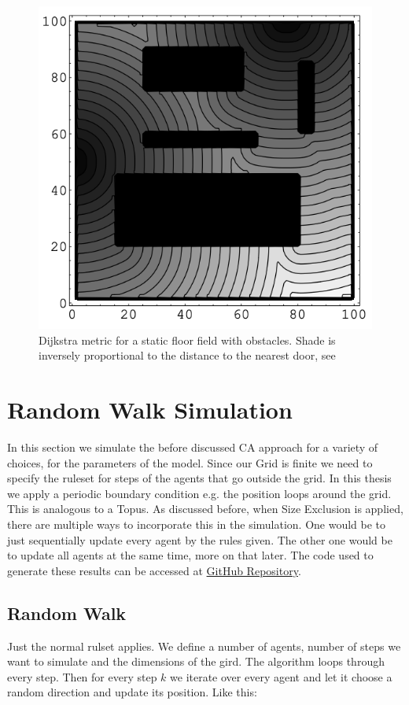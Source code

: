 \begin{figure}[h]
   \centering 
   \includegraphics[width=0.8\linewidth]{content/figures/static_field_with_obstacles.png} 
   \caption{Dijkstra metric for a static floor field with obstacles. Shade is inversely proportional to the distance to the nearest door, see \autocite{nishinari2004extended}}
   \label{fig:fig6}
\end{figure}

\newpage
\section{Random Walk Simulation}
In this section we simulate the before discussed CA approach for a variety of choices, for the parameters of the model. 
Since our Grid is finite we need to specify the ruleset for steps of the agents that go outside the grid.
In this thesis we apply a periodic boundary condition e.g. the position loops around the grid.
This is analogous to a Topus. 
As discussed before, when Size Exclusion is applied, there are multiple ways to incorporate this in the simulation. 
One would be to just sequentially update every agent by the rules given.
The other one would be to update all agents at the same time, more on that later. 
The code used to generate these results can be accessed at \href{https://github.com/SomeStein/Bachelor-Thesis}{GitHub Repository}.

\subsection{Random Walk}
Just the normal rulset applies. We define a number of agents, number of steps we want to simulate and the dimensions of the gird. 
The algorithm loops through every step. 
Then for every step $k$ we iterate over every agent and let it choose a random direction and update its position. 
Like this: 

